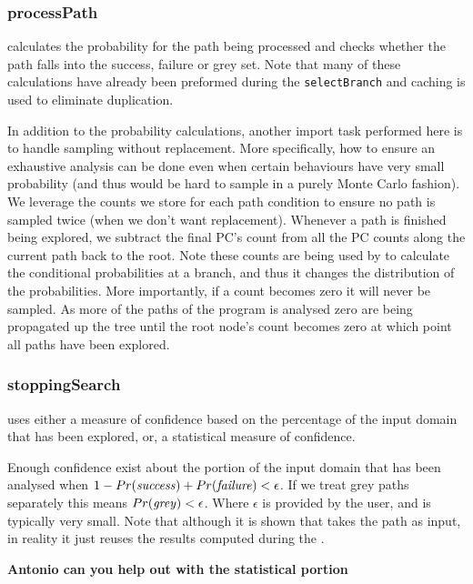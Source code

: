 \subsubsection{processPath} calculates the probability for the path being processed and checks whether the path falls into the success, failure or grey set. Note that many of these calculations have already been preformed during the {\tt selectBranch} and caching is used to eliminate duplication. 

In addition to the probability calculations, another import task performed here is to handle sampling without replacement. More specifically, how to ensure an exhaustive analysis can be done even when certain behaviours have very small probability (and thus would be hard to sample in a purely Monte Carlo fashion). We leverage the counts we store for each path condition to ensure no path is sampled twice (when we don't want replacement). Whenever a path is finished being explored, we subtract the final PC's count from all the PC counts along the current path back to the root. Note these counts are being used by  to calculate the conditional probabilities at a branch, and thus it changes the distribution of the probabilities. More importantly, if a count becomes zero it will never be sampled. As more of the paths of the program is analysed zero are being propagated up the tree until the root node's count becomes zero at which point all paths have been explored. 

\subsubsection{stoppingSearch} uses either a measure of confidence based on the percentage of the input domain that has been explored, or, a statistical measure of confidence. 

Enough confidence exist about the portion of the input domain that has been analysed when  $1 - Pr(\mathit{success}) + Pr(\mathit{failure}) < \epsilon$.  If we treat grey paths separately this means $Pr(\mathit{grey}) < \epsilon$. Where $\epsilon$ is provided by the user, and is typically very small. Note that although it is shown that  takes the path as input, in reality it just reuses the results computed during the . 

{\bf Antonio can you help out with the statistical portion}



